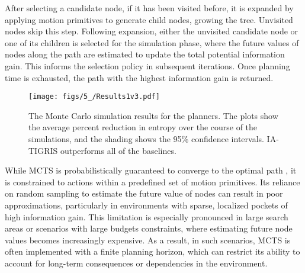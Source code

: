 After selecting a candidate node, if it has been visited before, it is expanded by applying motion primitives to generate child nodes, growing the tree. Unvisited nodes skip this step. Following expansion, either the unvisited candidate node or one of its children is selected for the simulation phase, where the future values of nodes along the path are estimated to update the total potential information gain. This informs the selection policy in subsequent iterations. Once planning time is exhausted, the path with the highest information gain is returned.

\begin{figure}[t]
\centering
\texttt{[image: figs/5\_/Results1v3.pdf]}
\caption{The Monte Carlo simulation results for the planners. The plots show the average percent reduction in entropy over the course of the simulations, and the shading shows the 95\% confidence intervals. IA-TIGRIS outperforms all of the baselines.}
\label{fig:mc_results}
\end{figure}

While MCTS is probabilistically guaranteed to converge to the optimal path \cite{mcts_ref_1}, it is constrained to actions within a predefined set of motion primitives. Its reliance on random sampling to estimate the future value of nodes can result in poor approximations, particularly in environments with sparse, localized pockets of high information gain. This limitation is especially pronounced in large search areas or scenarios with large budgets constraints, where estimating future node values becomes increasingly expensive. As a result, in such scenarios, MCTS is often implemented with a finite planning horizon, which can restrict its ability to account for long-term consequences or dependencies in the environment.



